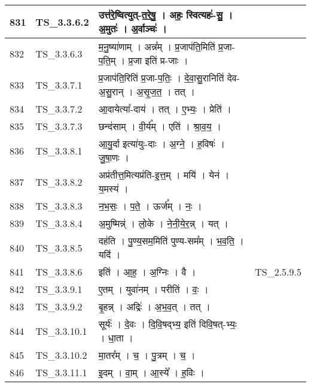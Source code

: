 \documentclass[17pt]{extarticle}
\begin{document}
\begin{longtable}{||p{0.4in}||p{0.9in}||p{4.0in}||p{0.9in}||}
            831 & TS\_3.3.6.2 & उत्त॑रे॒ष्वित्युत्{-}त॒रे॒षु॒   ।   अहः॒ स्वित्यहः॑{-}सु॒   ।   अ॒मुतः॑   ।   अ॒र्वाञ्चः॑   ।    &      \\
        \hline
            832 & TS\_3.3.6.3 & म॒नु॒ष्या॑णाम्   ।   अन्न᳚म्   ।   प्र॒जाप॑ति॒मिति॑ प्र॒जा{-}प॒ति॒म्   ।   प्र॒जा इति॑ प्र{-}जाः   ।    &      \\
        \hline
            833 & TS\_3.3.7.1 & प्र॒जाप॑ति॒रिति॑ प्र॒जा{-}प॒तिः॒   ।   दे॒वा॒सु॒रानिति॑ देव{-}अ॒सु॒रान्   ।   अ॒सृ॒ज॒त॒   ।   तत्   ।    &      \\
        \hline
            834 & TS\_3.3.7.2 & आ॒दायेत्या᳚{-}दाय॑   ।   तत्   ।   ए॒भ्यः॒   ।   प्रेति॑   ।    &      \\
        \hline
            835 & TS\_3.3.7.3 & छन्द॑साम्   ।   वी॒र्य᳚म्   ।   एति॑   ।   श्रा॒व॒य॒   ।    &      \\
        \hline
            836 & TS\_3.3.8.1 & आ॒यु॒र्दा इत्या॑युः{-}दाः   ।   अ॒ग्ने॒   ।   ह॒विषः॑   ।   जु॒षा॒णः   ।    &      \\
        \hline
            837 & TS\_3.3.8.2 & अप्र॑तीत्त॒मित्यप्र॑ति{-}इ॒त्त॒म्   ।   मयि॑   ।   येन॑   ।   य॒मस्य॑   ।    &      \\
        \hline
            838 & TS\_3.3.8.3 & न॒भ॒सः॒   ।   प॒ते॒   ।   ऊर्ज᳚म्   ।   नः॒   ।    &      \\
        \hline
            839 & TS\_3.3.8.4 & अ॒मुष्मिन्न्॑   ।   लो॒के   ।   ने॒नी॒ये॒र॒न्न्   ।   यत्   ।    &      \\
        \hline
            840 & TS\_3.3.8.5 & दह॑ति   ।   पु॒ण्य॒सम॒मिति॑ पुण्य{-}सम᳚म्   ।   भ॒व॒ति॒   ।   यदि॑   ।    &      \\
        \hline
            841 & TS\_3.3.8.6 & इति॑   ।   आ॒ह॒   ।   अ॒ग्निः   ।   वै   ।    & TS\_2.5.9.5        \\
        \hline
            842 & TS\_3.3.9.1 & ए॒तम्   ।   युवा॑नम्   ।   परीति॑   ।   वः॒   ।    &      \\
        \hline
            843 & TS\_3.3.9.2 & बृ॒हन्न्   ।   अद्रिः॑   ।   अ॒भ॒व॒त्   ।   तत्   ।    &      \\
        \hline
            844 & TS\_3.3.10.1 & सूर्यः॑   ।   दे॒वः   ।   दि॒वि॒षद्भ्य॒ इति॑ दिवि॒षत्{-}भ्यः॒   ।   धा॒ता   ।    &      \\
        \hline
            845 & TS\_3.3.10.2 & मा॒तर᳚म्   ।   च॒   ।   पु॒त्रम्   ।   च॒   ।    &      \\
        \hline
            846 & TS\_3.3.11.1 & इ॒दम्   ।   वा॒म्   ।   आ॒स्ये᳚   ।   ह॒विः   ।    &      \\

\end{longtable}
\end{document}
